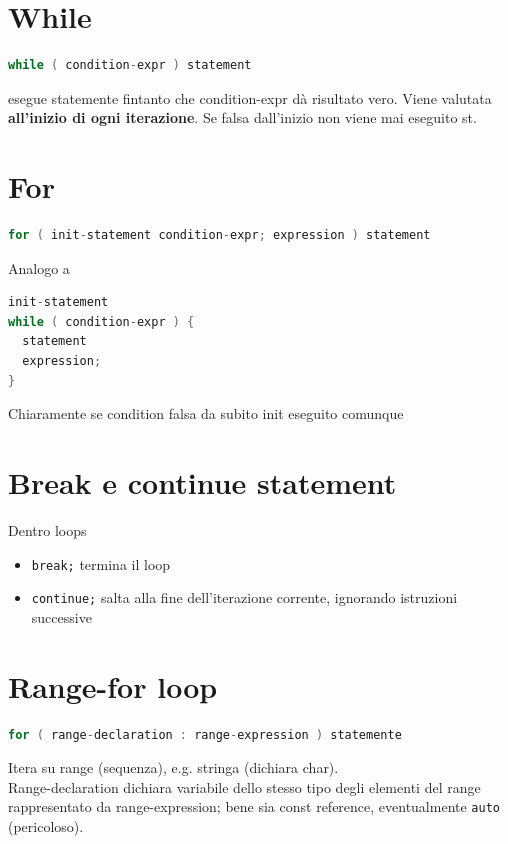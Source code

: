 \documentclass[10pt, oneside]{book}
\begin{document}
\section{While}
\begin{lstlisting}[language=C++]
while ( condition-expr ) statement
\end{lstlisting}
esegue statemente fintanto che condition-expr dà risultato vero. Viene valutata \textbf{all'inizio di ogni iterazione}. Se falsa dall'inizio non viene mai eseguito st.

\section{For}
\begin{lstlisting}[language=C++]
for ( init-statement condition-expr; expression ) statement
\end{lstlisting}
Analogo a
\begin{lstlisting}[language=C++]
init-statement
while ( condition-expr ) {
  statement
  expression;
}
\end{lstlisting}
Chiaramente se condition falsa da subito init eseguito comunque

\section{Break e continue statement}
Dentro loops
\begin{itemize}
\item \texttt{break;} termina il loop
\item \texttt{continue;} salta alla fine dell'iterazione corrente, ignorando istruzioni successive
\end{itemize}

\section{Range-for loop}
\begin{lstlisting}[language=C++]
for ( range-declaration : range-expression ) statemente
\end{lstlisting}
Itera su range (sequenza), e.g. stringa (dichiara char).\\
Range-declaration dichiara variabile dello stesso tipo degli elementi del range rappresentato da range-expression; bene sia const reference, eventualmente \texttt{auto} (pericoloso).
\end{document}
